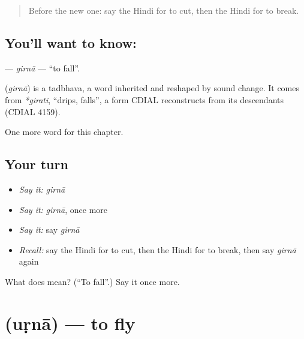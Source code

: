\label{lesson:HI-C161-girna}



\begin{quote}
Before the new one: say the Hindi for to cut, then the Hindi for to break.
\end{quote}

\subsection*{You'll want to know: }
\textbf{} — \emph{girnā} — \textquotedblleft{}to fall\textquotedblright{}.

\begin{cousinweb}
\textbf{} (\emph{girnā}) is a tadbhava, a word inherited and reshaped by sound change. It comes from \emph{*girati}, \textquotedblleft{}drips, falls\textquotedblright{}, a form CDIAL reconstructs from its descendants (CDIAL 4159).
\end{cousinweb}

\begin{grammarlens}[title={What you've built}]
One more word for this chapter.
\end{grammarlens}

\subsection*{Your turn}
\begin{itemize}
\raggedright
  \item \emph{Say it:} \emph{girnā}
  \item \emph{Say it:} \emph{girnā}, once more
  \item \emph{Say it:} say \emph{girnā}
  \item \emph{Recall:} say the Hindi for to cut, then the Hindi for to break, then say \emph{girnā} again
\end{itemize}

\begin{tcolorbox}[breakable,colback=teal!4,colframe=teal!35!black,title={Before you move on}]
What does  mean? (\textquotedblleft{}To fall\textquotedblright{}.) Say it once more.
\end{tcolorbox}
\section[\texorpdfstring{\hi{उड़ना} (uṛnā)}{उड़ना (uṛnā)}]{ (uṛnā) — to fly}

\label{lesson:HI-C161-urna}



